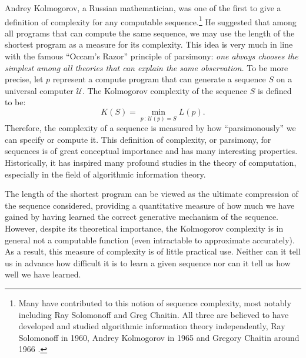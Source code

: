 \documentclass[\toplevelprefix/book-main.tex]{subfiles}
\begin{document}
Andrey Kolmogorov, a Russian mathematician, was one of the first to give a definition of complexity for any computable sequence.\footnote{Many have contributed to this notion of sequence complexity, most notably including Ray Solomonoff and Greg Chaitin. All three are believed to have developed and studied algorithmic information theory independently, Ray Solomonoff in 1960, Andrey Kolmogorov in 1965 \cite{Kolmogorov1998OnTO} and Gregory Chaitin around 1966 \cite{Chaitin-1966}.} He suggested that among all programs that can compute the same sequence, we may use the length of the shortest program as a measure for its complexity. This idea is very much in line with the famous ``Occam's Razor'' principle of parsimony: {\em one always chooses the simplest among all theories that can explain the same observation.} To be more precise, let $p$ represent a compute program that can generate a sequence $S$ on a universal computer $\mathcal{U}$. The  Kolmogorov complexity of the sequence $S$ is defined to be:
\begin{equation}
    K(S) = \min_{p\,:\, \mathcal{U}(p) = S} L(p). 
\end{equation}
Therefore, the complexity of a sequence is measured by how ``parsimonously'' we can specify or compute it. This definition of complexity, or parsimony, for sequences is of great conceptual importance and has many interesting properties. Historically, it has inspired many profound studies in the theory of computation, especially in the field of algorithmic information theory.

The length of the shortest program can be viewed as the ultimate compression of the sequence considered, providing a quantitative measure of how much we have gained by having learned the correct generative mechanism of the sequence. However, despite its theoretical importance, the Kolmogorov complexity is in general not a computable function \cite{Cover-Thomas} (even  intractable to approximate accurately). As a result, this measure of complexity is of little practical use. Neither can it tell us in advance how difficult it is to learn a given sequence nor can it tell us how well we have learned.





\end{document}

